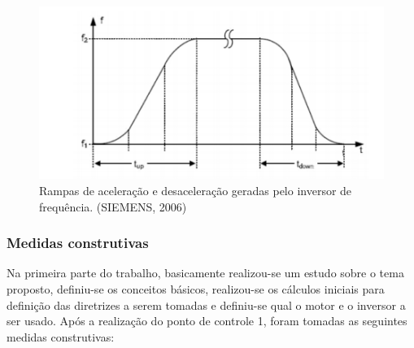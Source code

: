 \begin{figure}[h!]
	\centering
		\includegraphics[keepaspectratio=true,scale=0.9]{figuras/4.png}
	\caption{Rampas de aceleração e desaceleração geradas pelo inversor de frequência. (SIEMENS, 2006)}
    \label{rampas}
\end{figure}

\subsubsection*{Medidas construtivas}

Na primeira parte do trabalho, basicamente realizou-se um estudo sobre o tema proposto, definiu-se os conceitos básicos, realizou-se os cálculos iniciais para definição das diretrizes a serem tomadas e definiu-se qual o motor e o inversor a ser usado. Após a realização do ponto de controle 1, foram tomadas as seguintes medidas construtivas:

